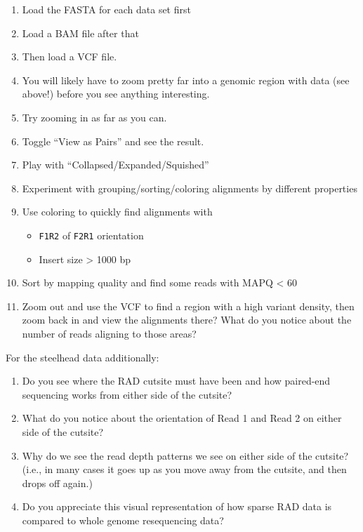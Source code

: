 \documentclass[]{krantz}
\providecommand{\tightlist}{%
  \setlength{\itemsep}{0pt}\setlength{\parskip}{0pt}}
\begin{document}
\begin{enumerate}
\def\labelenumi{\arabic{enumi}.}
\tightlist
\item
  Load the FASTA for each data set first
\item
  Load a BAM file after that
\item
  Then load a VCF file.
\item
  You will likely have to zoom pretty far into a genomic region with data (see above!)
  before you see anything interesting.
\item
  Try zooming in as far as you can.
\item
  Toggle ``View as Pairs'' and see the result.
\item
  Play with ``Collapsed/Expanded/Squished''
\item
  Experiment with grouping/sorting/coloring alignments by different properties
\item
  Use coloring to quickly find alignments with

  \begin{itemize}
  \tightlist
  \item
    \texttt{F1R2} of \texttt{F2R1} orientation
  \item
    Insert size \textgreater{} 1000 bp
  \end{itemize}
\item
  Sort by mapping quality and find some reads with MAPQ \textless{} 60
\item
  Zoom out and use the VCF to find a region with a high variant density, then zoom back
  in and view the alignments there? What do you notice about the number of reads aligning
  to those areas?
\end{enumerate}

For the steelhead data additionally:

\begin{enumerate}
\def\labelenumi{\arabic{enumi}.}
\tightlist
\item
  Do you see where the RAD cutsite must have been and how paired-end sequencing
  works from either side of the cutsite?
\item
  What do you notice about the orientation of Read 1 and Read 2 on either side of the cutsite?
\item
  Why do we see the read depth patterns we see on either side of the cutsite? (i.e., in many
  cases it goes up as you move away from the cutsite, and then drops off again.)
\item
  Do you appreciate this visual representation of how sparse RAD data is compared to whole
  genome resequencing data?
\end{enumerate}
\end{document}
